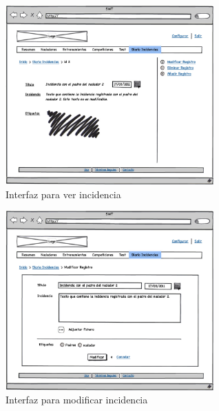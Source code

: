 		\begin{figure}[H]
		  \centering
		    \includegraphics[width=8cm]{./eps/p_interfaz/24_Diario_show.eps}
		  \caption{Interfaz para ver incidencia}
		  \label{fig:interfaz_incidencias_show}
		\end{figure}

		\begin{figure}[H]
		  \centering
		    \includegraphics[width=8cm]{./eps/p_interfaz/25_Diario_modif.eps}
		  \caption{Interfaz para modificar incidencia}
		  \label{fig:interfaz_incidencias_modif}
		\end{figure}
